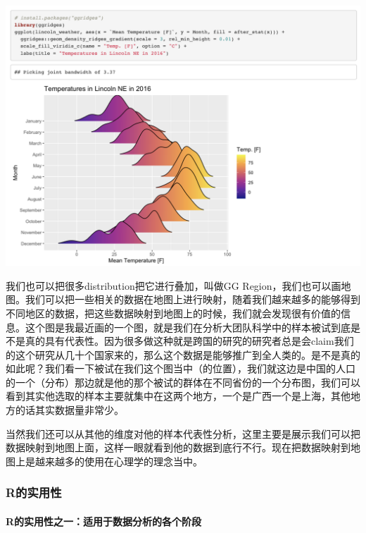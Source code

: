 \documentclass[
  oneside]{book}
\begin{document}
\includegraphics{1001-lesson1/image-20230302201322126.png}

我们也可以把很多distribution把它进行叠加，叫做GG Region，我们也可以画地图。我们可以把一些相关的数据在地图上进行映射，随着我们越来越多的能够得到不同地区的数据，把这些数据映射到地图上的时候，我们就会发现很有价值的信息。这个图是我最近画的一个图，就是我们在分析大团队科学中的样本被试到底是不是真的具有代表性。因为很多做这种就是跨国的研究的研究者总是会claim我们的这个研究从几十个国家来的，那么这个数据是能够推广到全人类的。是不是真的如此呢？我们看一下被试在我们这个图当中（的位置），我们就这边是中国的人口的一个（分布）那边就是他的那个被试的群体在不同省份的一个分布图，我们可以看到其实他选取的样本主要就集中在这两个地方，一个是广西一个是上海，其他地方的话其实数据量非常少。

当然我们还可以从其他的维度对他的样本代表性分析，这里主要是展示我们可以把数据映射到地图上面，这样一眼就看到他的数据到底行不行。现在把数据映射到地图上是越来越多的使用在心理学的理念当中。

\hypertarget{rux7684ux5b9eux7528ux6027}{%
\subsubsection{R的实用性}\label{rux7684ux5b9eux7528ux6027}}

\hypertarget{rux7684ux5b9eux7528ux6027ux4e4bux4e00ux9002ux7528ux4e8eux6570ux636eux5206ux6790ux7684ux5404ux4e2aux9636ux6bb5}{%
\paragraph{R的实用性之一：适用于数据分析的各个阶段}\label{rux7684ux5b9eux7528ux6027ux4e4bux4e00ux9002ux7528ux4e8eux6570ux636eux5206ux6790ux7684ux5404ux4e2aux9636ux6bb5}}
\end{document}
